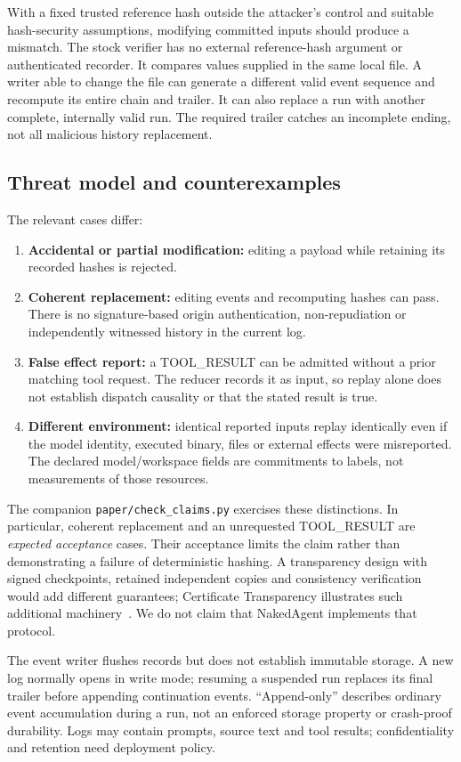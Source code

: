 \documentclass[10pt,twocolumn,letterpaper]{article}
\begin{document}
With a fixed trusted reference hash outside the attacker's control and suitable hash-security assumptions, modifying committed inputs should produce a mismatch. The stock verifier has no external reference-hash argument or authenticated recorder. It compares values supplied in the same local file. A writer able to change the file can generate a different valid event sequence and recompute its entire chain and trailer. It can also replace a run with another complete, internally valid run. The required trailer catches an incomplete ending, not all malicious history replacement.

\subsection{Threat model and counterexamples}
The relevant cases differ:
\begin{enumerate}
\item \textbf{Accidental or partial modification:} editing a payload while retaining its recorded hashes is rejected.
\item \textbf{Coherent replacement:} editing events and recomputing hashes can pass. There is no signature-based origin authentication, non-repudiation or independently witnessed history in the current log.
\item \textbf{False effect report:} a TOOL\_RESULT can be admitted without a prior matching tool request. The reducer records it as input, so replay alone does not establish dispatch causality or that the stated result is true.
\item \textbf{Different environment:} identical reported inputs replay identically even if the model identity, executed binary, files or external effects were misreported. The declared model/workspace fields are commitments to labels, not measurements of those resources.
\end{enumerate}

The companion \texttt{paper/check\_claims.py} exercises these distinctions. In particular, coherent replacement and an unrequested TOOL\_RESULT are \emph{expected acceptance} cases. Their acceptance limits the claim rather than demonstrating a failure of deterministic hashing. A transparency design with signed checkpoints, retained independent copies and consistency verification would add different guarantees; Certificate Transparency illustrates such additional machinery~\cite{rfc9162}. We do not claim that NakedAgent implements that protocol.

The event writer flushes records but does not establish immutable storage. A new log normally opens in write mode; resuming a suspended run replaces its final trailer before appending continuation events. ``Append-only'' describes ordinary event accumulation during a run, not an enforced storage property or crash-proof durability. Logs may contain prompts, source text and tool results; confidentiality and retention need deployment policy.
\end{document}
